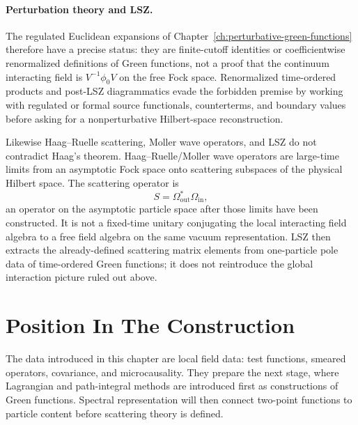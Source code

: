\paragraph{Perturbation theory and LSZ.}
The regulated Euclidean expansions of
Chapter~\ref{ch:perturbative-green-functions} therefore have a precise status:
they are finite-cutoff identities or coefficientwise renormalized definitions
of Green functions, not a proof that the continuum interacting field is
\(V^{-1}\phi_0V\) on the free Fock space.  Renormalized time-ordered products
and post-LSZ diagrammatics evade the forbidden premise by working with
regulated or formal source functionals, counterterms, and boundary values before
asking for a nonperturbative Hilbert-space reconstruction.

Likewise Haag--Ruelle scattering, Moller wave operators, and LSZ do not
contradict Haag's theorem.  Haag--Ruelle/Moller wave operators are large-time
limits from an asymptotic Fock space onto scattering subspaces of the physical
Hilbert space.  The scattering operator is
\[
  S=\Omega_{\mathrm{out}}^*\Omega_{\mathrm{in}},
\]
an operator on the asymptotic particle space after those limits have been
constructed.  It is not a fixed-time unitary conjugating the local interacting
field algebra to a free field algebra on the same vacuum representation.  LSZ
then extracts the already-defined scattering matrix elements from one-particle
pole data of time-ordered Green functions; it does not reintroduce the global
interaction picture ruled out above.

\section{Position In The Construction}

The data introduced in this chapter are local field data: test functions,
smeared operators, covariance, and microcausality. They prepare the next stage,
where Lagrangian and path-integral methods are introduced first as
constructions of Green functions. Spectral representation will then connect
two-point functions to particle content before scattering theory is defined.
